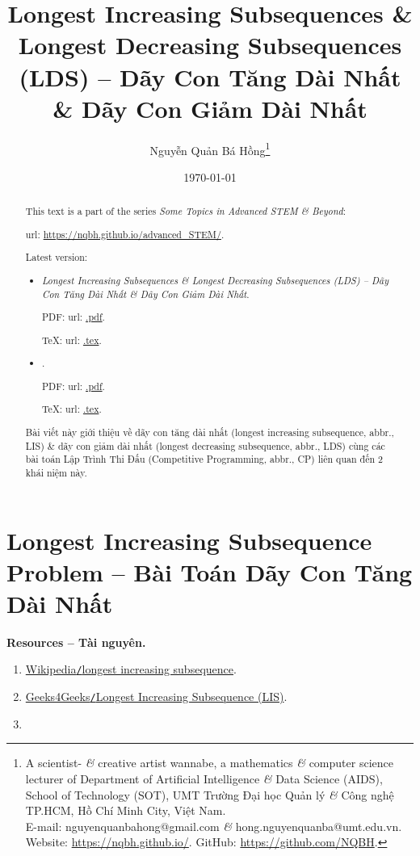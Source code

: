 \documentclass{article}
\title{Longest Increasing Subsequences \& Longest Decreasing Subsequences (LDS) -- Dãy Con Tăng Dài Nhất \& Dãy Con Giảm Dài Nhất}
\author{Nguyễn Quản Bá Hồng\footnote{A scientist- {\it\&} creative artist wannabe, a mathematics {\it\&} computer science lecturer of Department of Artificial Intelligence {\it\&} Data Science (AIDS), School of Technology (SOT), UMT Trường Đại học Quản lý {\it\&} Công nghệ TP.HCM, Hồ Chí Minh City, Việt Nam.\\E-mail: {\sf nguyenquanbahong@gmail.com} {\it\&} {\sf hong.nguyenquanba@umt.edu.vn}. Website: \url{https://nqbh.github.io/}. GitHub: \url{https://github.com/NQBH}.}}
\date{\today}
\begin{document}
    \maketitle
    \begin{abstract}
        This text is a part of the series {\it Some Topics in Advanced STEM \& Beyond}:

        {\sc url}: \url{https://nqbh.github.io/advanced_STEM/}.

        Latest version:
        \begin{itemize}
            \item {\it Longest Increasing Subsequences \& Longest Decreasing Subsequences (LDS) -- Dãy Con Tăng Dài Nhất \& Dãy Con Giảm Dài Nhất}.

            PDF: {\sc url}: \url{.pdf}.

            \TeX: {\sc url}: \url{.tex}.
            \item {\it }.

            PDF: {\sc url}: \url{.pdf}.

            \TeX: {\sc url}: \url{.tex}.
        \end{itemize}
        Bài viết này giới thiệu về dãy con tăng dài nhất (longest increasing subsequence, abbr., LIS) \& dãy con giảm dài nhất (longest decreasing subsequence, abbr., LDS) cùng các bài toán Lập Trình Thi Đấu (Competitive Programming, abbr., CP) liên quan đến 2 khái niệm này.
    \end{abstract}
    \tableofcontents


    \section{Longest Increasing Subsequence Problem -- Bài Toán Dãy Con Tăng Dài Nhất}
    \textbf{\textsf{Resources -- Tài nguyên.}}
    \begin{enumerate}
        \item \href{https://en.wikipedia.org/wiki/Longest_increasing_subsequence}{Wikipedia{\tt/}longest increasing subsequence}.

        \item \href{https://www.geeksforgeeks.org/dsa/longest-increasing-subsequence-dp-3/}{Geeks4Geeks{\tt/}Longest Increasing Subsequence (LIS)}.

        \item
    \end{enumerate}
\end{document}
